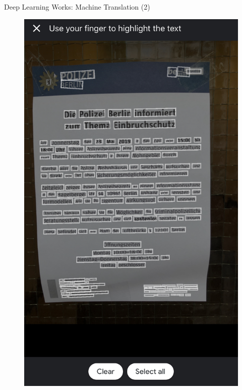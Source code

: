 \documentclass[notheorems]{beamer}
\begin{document}
    \begin{frame}{Deep Learning Works: Machine Translation (2) }

        \begin{figure}
            \begin{minipage}[t]{.42\textwidth}
                \includegraphics[width=\textwidth]{figures/translate_image}
             \end{minipage} %
             \hfill%
            \begin{minipage}{.42\textwidth}
                \vspace{-7.3cm}

\end{minipage}
\end{figure}
\end{frame}
\end{document}
